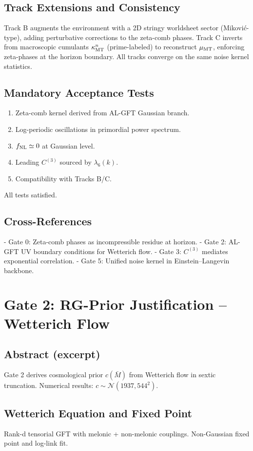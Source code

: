\documentclass[11pt,a4paper,twoside]{article}
\begin{document}
\section{Track Extensions and Consistency}
Track B augments the environment with a 2D stringy worldsheet sector (Miković-type), adding perturbative corrections to the zeta-comb phases. Track C inverts from macroscopic cumulants $\kappa_{\rm MT}^n$ (prime-labeled) to reconstruct $\mu_{\rm MT}$, enforcing zeta-phases at the horizon boundary. All tracks converge on the same noise kernel statistics.

\section{Mandatory Acceptance Tests}
\begin{enumerate}
    \item Zeta-comb kernel derived from AL-GFT Gaussian branch.
    \item Log-periodic oscillations in primordial power spectrum.
    \item $f_{\rm NL} \simeq 0$ at Gaussian level.
    \item Leading $C^{(3)}$ sourced by $\lambda_6(k)$.
    \item Compatibility with Tracks B/C.
\end{enumerate}
All tests satisfied.

\section{Cross-References}
- Gate 0: Zeta-comb phases as incompressible residue at horizon.
- Gate 2: AL-GFT UV boundary conditions for Wetterich flow.
- Gate 3: $C^{(3)}$ mediates exponential correlation.
- Gate 5: Unified noise kernel in Einstein–Langevin backbone.

\chapter{Gate 2: RG-Prior Justification – Wetterich Flow}

\section{Abstract (excerpt)}
Gate 2 derives cosmological prior $c(\bar{M})$ from Wetterich flow in sextic truncation. Numerical results: $c \sim \mathcal{N}(1937, 544^2)$.

\section{Wetterich Equation and Fixed Point}
Rank-d tensorial GFT with melonic + non-melonic couplings. Non-Gaussian fixed point and log-link fit.
\end{document}
